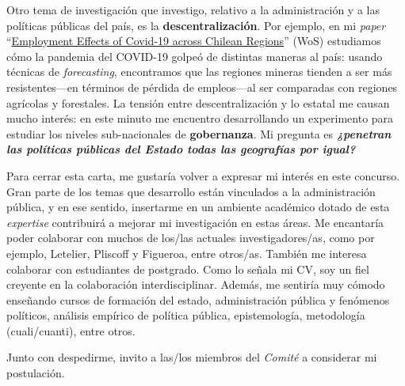 \documentclass[12pt,stdletter,dateno,sigleft]{newlfm} %
\begin{document}
\begin{newlfm}
Otro tema de investigaci\'on que investigo, relativo a la administraci\'on y a las pol\'iticas p\'ublicas del pa\'is, es la {\bf descentralizaci\'on}. Por ejemplo, en mi \emph{paper} ``\href{https://doi.org/10.1111/rsp3.12337}{Employment Effects of Covid‐19 across Chilean Regions}'' (WoS) estudiamos c\'omo la pandemia del COVID-19 golpe\'o de distintas maneras al pa\'is: usando t\'ecnicas de \emph{forecasting}, encontramos que las regiones mineras tienden a ser m\'as resistentes---en t\'erminos de p\'erdida de empleos---al ser comparadas con regiones agr\'icolas y forestales. La tensi\'on entre descentralizaci\'on y lo estatal me causan mucho inter\'es: en este minuto me encuentro desarrollando un experimento para estudiar los niveles sub-nacionales de {\bf gobernanza}. Mi pregunta es {\bf \emph{¿penetran las pol\'iticas p\'ublicas del Estado todas las geograf\'ias por igual?}}


Para cerrar esta carta, me gustar\'ia volver a expresar mi inter\'es en este concurso. Gran parte de los temas que desarrollo est\'an vinculados a la administraci\'on p\'ublica, y en ese sentido, insertarme en un ambiente acad\'emico dotado de esta \emph{expertise} contribuir\'a a mejorar mi investigaci\'on en estas \'areas. Me encantar\'ia poder colaborar con muchos de los/las actuales investigadores/as, como por ejemplo, Letelier, Pliscoff y Figueroa, entre otros/as. Tambi\'en me interesa colaborar con estudiantes de postgrado. Como lo se\~nala mi CV, soy un fiel creyente en la colaboraci\'on interdisciplinar. Adem\'as, me sentir\'ia muy c\'omodo ense\~nando cursos de formaci\'on del estado, administraci\'on p\'ublica y fen\'omenos pol\'iticos, an\'alisis emp\'irico de pol\'itica p\'ublica, epistemolog\'ia, metodolog\'ia (cuali/cuanti), entre otros. 

Junto con despedirme, invito a las/los miembros del \emph{Comit\'e} a considerar mi postulaci\'on.\unskip




\end{newlfm}
\end{document}
